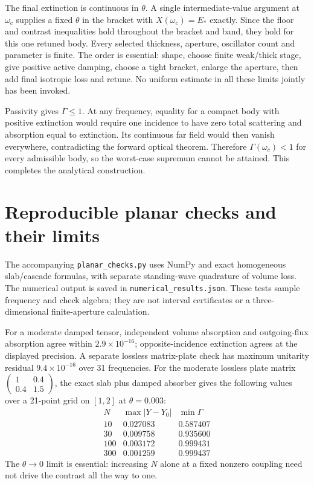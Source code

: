 \documentclass[11pt]{article}
\newcommand{\abs}[1]{\left|#1\right|}
\begin{document}
The final extinction is continuous in $\theta$. A single intermediate-value
argument at $\omega_c$ supplies a fixed $\theta$ in the bracket with
$X(\omega_c)=E_*$ exactly. Since the floor and contrast inequalities hold
throughout the bracket and band, they hold for this one retuned body.
Every selected thickness, aperture, oscillator count and parameter is finite.
The order is essential: shape, choose finite weak/thick stage, give positive
active damping, choose a tight bracket, enlarge the aperture, then add final
isotropic loss and retune. No uniform estimate in all these limits jointly
has been invoked.

Passivity gives $\Gamma\le1$. At any frequency, equality for a compact body
with positive extinction would require one incidence to have zero total
scattering and absorption equal to extinction. Its continuous far field would
then vanish everywhere, contradicting the forward optical theorem. Therefore
$\Gamma(\omega_c)<1$ for every admissible body, so the worst-case supremum
cannot be attained. This completes the analytical construction.

\section{Reproducible planar checks and their limits}
The accompanying \texttt{planar\_checks.py} uses NumPy and exact homogeneous
slab/cascade formulas, with separate standing-wave quadrature of volume loss.
The numerical output is saved in \texttt{numerical\_results.json}.
These tests sample frequency and check algebra; they are not interval
certificates or a three-dimensional finite-aperture calculation.

For a moderate damped tensor, independent volume absorption and outgoing-flux
absorption agree within $2.9\times10^{-16}$; opposite-incidence extinction
agrees at the displayed precision. A separate lossless matrix-plate check
has maximum unitarity residual $9.4\times10^{-16}$ over 31 frequencies.
For the moderate lossless plate matrix
$\left(\begin{smallmatrix}1&0.4\\0.4&1.5\end{smallmatrix}\right)$,
the exact slab plus damped absorber gives the following values over a
21-point grid on $[1,2]$ at $\theta=0.003$:
\[
\begin{array}{c|cc}
N & \max\abs{Y-Y_0} & \min\Gamma\\ \hline
10 & 0.027083 & 0.587407\\
30 & 0.009758 & 0.935600\\
100 & 0.003172 & 0.999431\\
300 & 0.001259 & 0.999437
\end{array}
\]
The $\theta\to0$ limit is essential: increasing $N$ alone at a fixed nonzero
coupling need not drive the contrast all the way to one.
\end{document}
